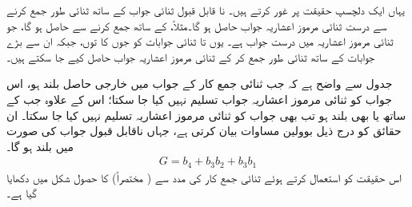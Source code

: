 یہاں ایک دلچسپ حقیقت پر غور کرتے ہیں۔ نا قابل قبول ثنائی جواب کے ساتھ  ثنائی طور جمع کرنے سے درست ثنائی مرموز اعشاریہ جواب حاصل ہو گا۔مثلاً، کے ساتھ  جمع کرنے سے  حاصل ہو گا، جو ثنائی مرموز اعشاریہ میں درست جواب ہے۔ یوں  تا  ثنائی جوابات کو جوں کا توں، جبکہ ان سے بڑے جوابات کے ساتھ  ثنائی طور جمع کر کے ثنائی مرموز اعشاریہ جواب حاصل کیے جا سکتے ہیں۔

	
جدول سے واضح ہے کہ جب ثنائی جمع کار کے جواب میں خارجی حاصل  بلند ہو، اس جواب کو ثنائی مرموز اعشاریہ جواب تسلیم نہیں کیا جا سکتا؛ اس کے علاوہ جب  کے ساتھ  یا  بھی بلند ہو تب بھی جواب کو ثنائی مرموز اعشاریہ تسلیم نہیں کیا جا سکتا۔ ان حقائق کو درج ذیل بوولین مساوات بیان کرتی ہے، جہاں ناقابل قبول جواب کی صورت میں  بلند ہو گا۔
 \begin{align}
 G=b_4+b_3b_2+b_3b_1
 \end{align}
اس حقیقت کو استعمال کرتے ہوئے ثنائی جمع کار کی مدد سے ( مختصراً)  کا حصول شکل  میں دکھایا گیا ہے۔
